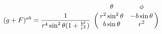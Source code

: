 \begin{equation}
(g+F)^{ab}= \frac{1}{r^4 \sin ^2 \theta(1+\frac{b^2}{r^4})}
\bordermatrix{ &\theta             & \phi            \cr &r^2
\sin ^2 \theta & -b \sin \theta  \cr &b \sin \theta      & r^2 }
\end{equation}


